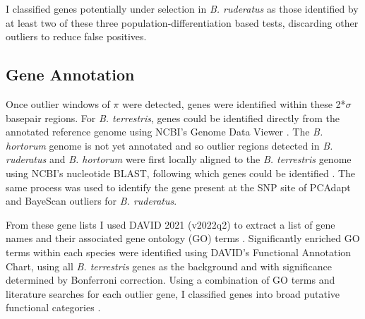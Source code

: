 \documentclass[12pt]{article}
\begin{document}
\begin{linenumbers}
		I classified genes potentially under selection in \emph{B. ruderatus} as those identified by at least two of these three population-differentiation based tests, discarding other outliers to reduce false positives.
		

		\subsection{Gene Annotation}
		
		Once outlier windows of $\pi$ were detected, genes were identified within these 2*$\sigma$ basepair regions. 
		For \emph{B. terrestris}, genes could be identified directly from the annotated reference genome using NCBI's Genome Data Viewer \citep{rangwala_accessing_2021}. The \emph{B. hortorum} genome is not yet annotated and so outlier regions detected in \emph{B. ruderatus} and \emph{B. hortorum} were first locally aligned to the \emph{B. terrestris} genome using NCBI's nucleotide BLAST, following which genes could be identified \citep{altschul_basic_1990}. The same process was used to identify the gene present at the SNP site of PCAdapt and BayeScan outliers for \emph{B. ruderatus}. 
		
		From these gene lists I used DAVID 2021 (v2022q2) to extract a list of gene names and their associated gene ontology (GO) terms \citep{huang_systematic_2009, sherman_david_2022}. Significantly enriched GO terms within each species were identified using DAVID's Functional Annotation Chart, using all \emph{B. terrestris} genes as the background and with significance determined by Bonferroni correction. Using a combination of GO terms and literature searches for each outlier gene, I classified genes into broad putative functional categories \citep{ashburner_gene_2000, the_gene_ontology_consortium_gene_2021}. 
		
		
		
		
      	

      	

\end{linenumbers}
\end{document}
